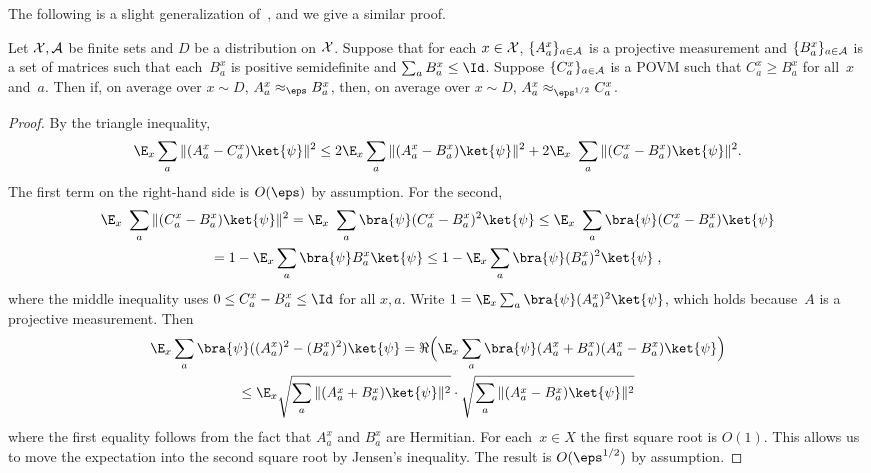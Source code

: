 The following is a slight generalization of~\cite[Fact~4.25]{NW19},
and we give a similar proof.

\begin{lemma}
  \label{lem:replace-with-measurement}
  Let $\cal{X},\cal{A}$ be finite sets and $D$ be a distribution on $\cal{X}$.
  Suppose that for each $x\in \cal{X}$, $\{A^x_a\}_{a\in \cal{A}}$ is a
  projective measurement and $\{B^x_a\}_{a\in \cal{A}}$ is a set of matrices
  such that each~$B^x_a$ is positive semidefinite and $\sum_{a}B^x_a \leq \Id$.
  Suppose $\{C^x_a\}_{a \in \cal{A}}$ is a POVM such that $C^x_a \geq B^x_a$ for
  all~$x$ and~$a$.
  Then if, on average over $x\sim D$, $A^x_a \approx_{\eps} B^x_a$, then, on
  average over $x\sim D$, $A^x_a \approx_{\eps^{1/2}} C^x_a$.
\end{lemma}

\begin{proof}
  By the triangle inequality,
  \begin{equation*}
    \E_{x} \sum_a \Vert (A^{x}_a - C^{x}_a) \ket{\psi} \Vert^2
    \leq 2\E_{x} \sum_a \Vert (A^{x}_a - B^{x}_a) \ket{\psi} \Vert^2
    + 2 \E_{x}\ \sum_a \Vert (C^x_a - B^x_a) \ket{\psi}\Vert^2.
\end{equation*}
The first term on the right-hand side is $O(\eps)$ by assumption.
For the second,
\begin{multline*}
  \E_{x}\ \sum_a \Vert (C^x_a - B^x_a) \ket{\psi}\Vert^2
  = \E_{x}\ \sum_a \bra{\psi} (C^x_a - B^x_a)^2 \ket{\psi}
  \leq \E_{x}\ \sum_a \bra{\psi} (C^x_a - B^x_a) \ket{\psi}\\
  = 1- \E_{x} \sum_a\bra{\psi}  B^{x}_a \ket{\psi}
  \leq1- \E_{x} \sum_a\bra{\psi}  (B^{x}_a)^2 \ket{\psi}\;,
\end{multline*}
where the middle inequality uses $0\leq C^x_a-B^x_a\leq \Id$ for all $x,a$. 
Write $1 = \E_{x} \sum_a \bra{\psi} (A^{x}_a)^2 \ket{\psi}$, which holds
because~$A$ is a projective measurement.
Then
\begin{multline*}
  \E_{x} \sum_a \bra{\psi} ((A^{x}_a)^2  - (B^{x}_a)^2)\ket{\psi}
  = \Re\Big(\E_{x} \sum_a \bra{\psi} (A^{x}_a  + B^{x}_a)(A^{x}_a - B^{x}_a)
  \ket{\psi}\Big)\\
  \leq \E_{x} \sqrt{\sum_a \Vert (A^{x}_a + B^{x}_a) \ket{\psi}\Vert^2}
	\cdot \sqrt{\sum_a \Vert (A^{x}_a - B^{x}_a)\ket{\psi} \Vert^2}
\end{multline*}
where the first equality follows from the fact that $A^x_a$ and $B^x_a$ are
Hermitian.
For each~$x\in X$ the first square root is $O(1)$.
This allows us to move the expectation into the second square root by Jensen's
inequality.
The result is $O(\eps^{1/2})$ by assumption. 
\end{proof}

